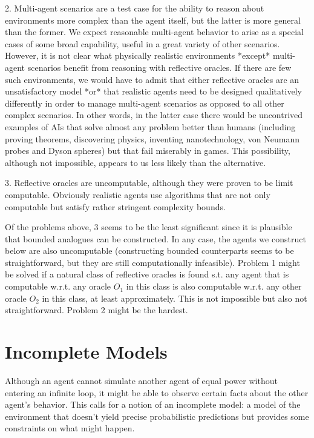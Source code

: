 \documentclass[a4paper]{article}
\begin{document}
2. Multi-agent scenarios are a test case for the ability to reason about environments more complex than the agent itself, but the latter is more general than the former. We expect reasonable multi-agent behavior to arise as a special cases of some broad capability, useful in a great variety of other scenarios. However, it is not clear what physically realistic environments *except* multi-agent scenarios benefit from reasoning with reflective oracles. If there are few such environments, we would have to admit that either reflective oracles are an unsatisfactory model *or* that realistic agents need to be designed qualitatively differently in order to manage multi-agent scenarios as opposed to all other complex scenarios. In other words, in the latter case there would be uncontrived examples of AIs that solve almost any problem better than humans (including proving theorems, discovering physics, inventing nanotechnology, von Neumann probes and Dyson spheres) but that fail miserably in games. This possibility, although not impossible, appears to us less likely than the alternative.

3. Reflective oracles are uncomputable, although they were proven to be limit computable. Obviously realistic agents use algorithms that are not only computable but satisfy rather stringent complexity bounds.

Of the problems above, 3 seems to be the least significant since it is plausible that bounded analogues can be constructed. In any case, the agents we construct below are also uncomputable (constructing bounded counterparts seems to be straightforward, but they are still computationally infeasible). Problem 1 might be solved if a natural class of reflective oracles is found s.t. any agent that is computable w.r.t. any oracle ${O_1}$ in this class is also computable w.r.t. any other oracle ${O_2}$ in this class, at least approximately. This is not impossible but also not straightforward. Problem 2 might be the hardest.

\section{Incomplete Models}

Although an agent cannot simulate another agent of equal power without entering an infinite loop, it might be able to observe certain facts about the other agent's behavior. This calls for a notion of an incomplete model: a model of the environment that doesn't yield precise probabilistic predictions but provides some constraints on what might happen. 
\end{document}
